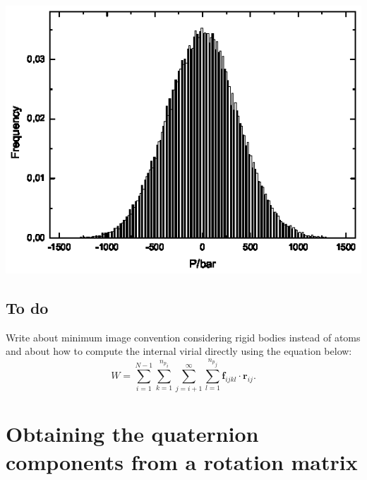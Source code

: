 \documentclass[aip,jcp,reprint,amsmath,amssymb]{revtex4-1}
\newcommand{\vt}[1]{\boldsymbol{\mathbf{#1}}}           %
\begin{document}
\begin{center}
\label{fig:pressure}
\includegraphics{pressure3}
\end{center}

\subsection{To do}

Write about minimum image convention considering rigid bodies instead of atoms and about how to compute the internal virial directly using the equation below:
\[
W = \sum_{i=1}^{N-1} \sum_{k=1}^{{n_p}_i} \sum_{j=i+1}^{\infty} \sum_{l=1}^{{n_p}_j} {\vt f}_{ijkl} \cdot {\vt r}_{ij}.
\]

\appendix

\section{\label{sec:quat_from_A}Obtaining the quaternion components from a rotation matrix}
\end{document}
